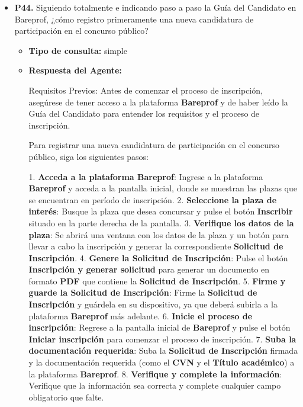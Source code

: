 \documentclass{article}
\begin{document}
\begin{itemize}
\begin{itemize}
            \end{itemize}

      \item \textbf{P44.} Siguiendo totalmente e indicando paso a paso la Guía del Candidato en Bareprof, ¿cómo registro primeramente una nueva candidatura de participación en el concurso público? \\
            \begin{itemize}
                  \item \textbf{Tipo de consulta:} simple
                  \item \textbf{Respuesta del Agente:}

                        Requisitos Previos:
                        Antes de comenzar el proceso de inscripción, asegúrese de tener acceso a la plataforma \textbf{Bareprof} y de haber leído la Guía del Candidato para entender los requisitos y el proceso de inscripción.

                        Para registrar una nueva candidatura de participación en el concurso público, siga los siguientes pasos:

                        1. \textbf{Acceda a la plataforma Bareprof}: Ingrese a la plataforma \textbf{Bareprof} y acceda a la pantalla inicial, donde se muestran las plazas que se encuentran en período de inscripción.
                        2. \textbf{Seleccione la plaza de interés}: Busque la plaza que desea concursar y pulse el botón \textbf{Inscribir} situado en la parte derecha de la pantalla.
                        3. \textbf{Verifique los datos de la plaza}: Se abrirá una ventana con los datos de la plaza y un botón para llevar a cabo la inscripción y generar la correspondiente \textbf{Solicitud de Inscripción}.
                        4. \textbf{Genere la Solicitud de Inscripción}: Pulse el botón \textbf{Inscripción y generar solicitud} para generar un documento en formato \textbf{PDF} que contiene la \textbf{Solicitud de Inscripción}.
                        5. \textbf{Firme y guarde la Solicitud de Inscripción}: Firme la \textbf{Solicitud de Inscripción} y guárdela en su dispositivo, ya que deberá subirla a la plataforma \textbf{Bareprof} más adelante.
                        6. \textbf{Inicie el proceso de inscripción}: Regrese a la pantalla inicial de \textbf{Bareprof} y pulse el botón \textbf{Iniciar inscripción} para comenzar el proceso de inscripción.
                        7. \textbf{Suba la documentación requerida}: Suba la \textbf{Solicitud de Inscripción} firmada y la documentación requerida (como el \textbf{CVN} y el \textbf{Título académico}) a la plataforma \textbf{Bareprof}.
                        8. \textbf{Verifique y complete la información}: Verifique que la información sea correcta y complete cualquier campo obligatorio que falte.


\end{itemize}
\end{itemize}
\end{document}
